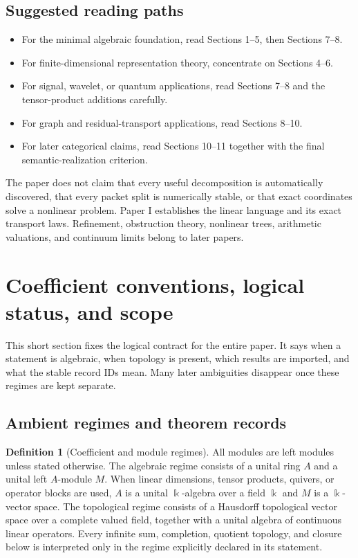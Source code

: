 \documentclass[11pt]{article}
\theoremstyle{definition}
\newtheorem{definition}[definition]{Definition}
\theoremstyle{remark}
\theoremstyle{definition}\newtheorem{example}[theorem]{Example}
\newcommand{\bbk}{\Bbbk}
\newcommand{\RecordID}[1]{\label{record:#1}}
\begin{document}
\subsection*{Suggested reading paths}
\begin{itemize}
\item For the minimal algebraic foundation, read Sections 1--5, then Sections 7--8.
\item For finite-dimensional representation theory, concentrate on Sections 4--6.
\item For signal, wavelet, or quantum applications, read Sections 7--8 and the tensor-product additions carefully.
\item For graph and residual-transport applications, read Sections 8--10.
\item For later categorical claims, read Sections 10--11 together with the final semantic-realization criterion.
\end{itemize}

\begin{warningbox}
The paper does not claim that every useful decomposition is automatically discovered, that every packet split is numerically stable, or that exact coordinates solve a nonlinear problem.  Paper I establishes the linear language and its exact transport laws.  Refinement, obstruction theory, nonlinear trees, arithmetic valuations, and continuum limits belong to later papers.
\end{warningbox}

\section{Coefficient conventions, logical status, and scope}
\begin{readerroadmap}
This short section fixes the logical contract for the entire paper.  It says when a statement is algebraic, when topology is present, which results are imported, and what the stable record IDs mean.  Many later ambiguities disappear once these regimes are kept separate.
\end{readerroadmap}
\subsection{Ambient regimes and theorem records}

\begin{definition}[Coefficient and module regimes]
\label{def:coefficient-regime}
All modules are left modules unless stated otherwise.  The algebraic regime consists of a unital ring $A$ and a unital left $A$-module $M$.  When linear dimensions, tensor products, quivers, or operator blocks are used, $A$ is a unital $\bbk$-algebra over a field $\bbk$ and $M$ is a $\bbk$-vector space.  The topological regime consists of a Hausdorff topological vector space over a complete valued field, together with a unital algebra of continuous linear operators.  Every infinite sum, completion, quotient topology, and closure below is interpreted only in the regime explicitly declared in its statement.
\end{definition}
\RecordID{PSC-I-D-COEFFICIENT-REGIME}
\end{document}
